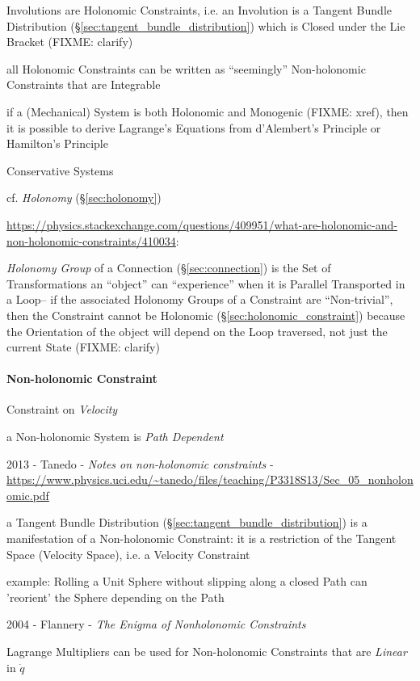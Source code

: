 Involutions are Holonomic Constraints, i.e. an Involution is a Tangent Bundle
Distribution (\S\ref{sec:tangent_bundle_distribution}) which is Closed under
the Lie Bracket (FIXME: clarify)

all Holonomic Constraints can be written as ``seemingly'' Non-holonomic
Constraints that are Integrable

\asterism

if a (Mechanical) System is both Holonomic and Monogenic (FIXME: xref), then it
is possible to derive Lagrange's Equations from d'Alembert's Principle or
Hamilton's Principle

Conservative Systems

cf. \emph{Holonomy} (\S\ref{sec:holonomy})

\url{https://physics.stackexchange.com/questions/409951/what-are-holonomic-and-non-holonomic-constraints/410034}:

\emph{Holonomy Group} of a Connection (\S\ref{sec:connection}) is the Set of
Transformations an ``object'' can ``experience'' when it is Parallel
Transported in a Loop-- if the associated Holonomy Groups of a Constraint are
``Non-trivial'', then the Constraint cannot be Holonomic
(\S\ref{sec:holonomic_constraint}) because the Orientation of the object will
depend on the Loop traversed, not just the current State (FIXME: clarify)



\paragraph{Non-holonomic Constraint}\label{sec:nonholonomic_constraint}\hfill

Constraint on \emph{Velocity}

a Non-holonomic System is \emph{Path Dependent}

2013 - Tanedo - \emph{Notes on non-holonomic constraints} -
\url{https://www.physics.uci.edu/~tanedo/files/teaching/P3318S13/Sec_05_nonholonomic.pdf}

a Tangent Bundle Distribution (\S\ref{sec:tangent_bundle_distribution}) is a
manifestation of a Non-holonomic Constraint: it is a restriction of the Tangent
Space (Velocity Space), i.e. a Velocity Constraint

example: Rolling a Unit Sphere without slipping along a closed Path can
'reorient' the Sphere depending on the Path

2004 - Flannery - \emph{The Enigma of Nonholonomic Constraints}

Lagrange Multipliers can be used for Non-holonomic Constraints that are
\emph{Linear} in $\dot{q}$



